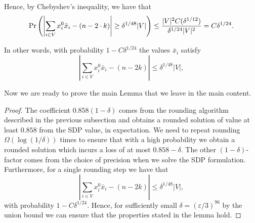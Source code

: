 Hence, by Chebyshev's inequality, we have that 
\begin{equation*}
  \Pr\left(  \left|\sum_{i \in V} x_i^0 \bar{x}_i - (n-2\cdot k) \right| \geq \delta^{1/48} |V|\right) \leq  \frac{|V|^2 C(\delta^{1/12})}{\delta^{1/24}|V|^2} = C\delta^{1/24}.
\end{equation*}

In other words, with probability $1- C\delta^{1/24}$ the values $\bar{x}_i$ satisfy 
\begin{equation}
	\left|\sum_{i \in V} x_i^0 \bar{x}_i - (n-2k) \right| \leq \delta^{1/48} |V|,
\end{equation}

Now we are ready to prove the main Lemma that we leave in the main content.
\boundvariance*

\begin{proof}
	The coefficient $0.858 (1-\delta)$ comes from the rounding algorithm described in the previous subsection and obtains a rounded solution of value at least $0.858$ from 
	the SDP value, in expectation. We need to repeat rounding $\Omega(\log(1/\delta))$
	times to ensure that with a high probability we obtain a rounded solution which incurs a loss of at most $0.858-\delta $. 
 The other $(1 - \delta)$-factor comes from the choice of precision when we solve the SDP formulation. 
Furthermore,
	for a single rounding step we have that 
\begin{equation}\label{eq:no_vertices_to_move}
	\left|\sum_{i \in V} x_i^0 \bar{x}_i - (n-2k) \right| \leq \delta^{1/48} |V|,
\end{equation}
with probability $1- C\delta^{1/24}$. Hence, for sufficiently small $\delta = (\varepsilon/3)^{96}$ by the union bound 
we can ensure that the properties stated in the lemma hold.
\end{proof}








